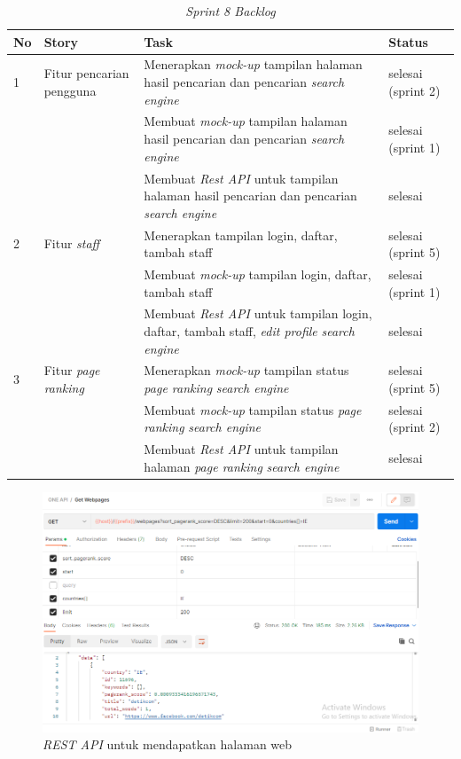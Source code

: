 \begin{longtable}{@{}|p{0.5cm}|p{4cm}|p{6cm}|p{2cm}|@{}}
	\caption{\textit{Sprint 8 Backlog}}\\	
	\hline
	\textbf{No} & \textbf{Story} & \textbf{Task} & \textbf{Status} \\
	\hline
	1 & Fitur pencarian pengguna & Menerapkan \textit{mock-up} tampilan halaman hasil pencarian dan pencarian \textit{search engine} & selesai (sprint 2) \\
	\cline{3-4}
	& & Membuat \textit{mock-up} tampilan halaman hasil pencarian dan pencarian \textit{search engine} & selesai  (sprint 1) \\
	\cline{3-4}
	& & Membuat \textit{Rest API} untuk tampilan halaman hasil pencarian dan pencarian \textit{search engine} & selesai  \\
	\cline{1-4}
	2 & Fitur \textit{staff} & Menerapkan tampilan login, daftar, tambah staff & selesai (sprint 5) \\
	\cline{3-4}
	& & Membuat \textit{mock-up} tampilan login, daftar, tambah staff & selesai (sprint 1) \\
	\cline{3-4}
	& & Membuat \textit{Rest API} untuk tampilan login, daftar, tambah staff, \textit{edit profile} \textit{search engine} & selesai \\
	\cline{1-4}
	3 & Fitur \textit{page ranking} & Menerapkan \textit{mock-up} tampilan status \textit{page ranking} \textit{search engine} & selesai (sprint 5) \\
	\cline{3-4}
	& & Membuat \textit{mock-up} tampilan status \textit{page ranking} \textit{search engine} & selesai (sprint 2) \\
	\cline{3-4}
	& & Membuat \textit{Rest API} untuk tampilan halaman \textit{page ranking} \textit{search engine} & selesai \\
	\hline
	
\end{longtable}


\begin{figure}[H]
	\centering
	\includegraphics[keepaspectratio, width=13cm]{gambar/rest_webpages.png}
	\caption{\textit{REST API} untuk mendapatkan halaman web}
	\label{gambar:rest_webpages.png}
\end{figure}

